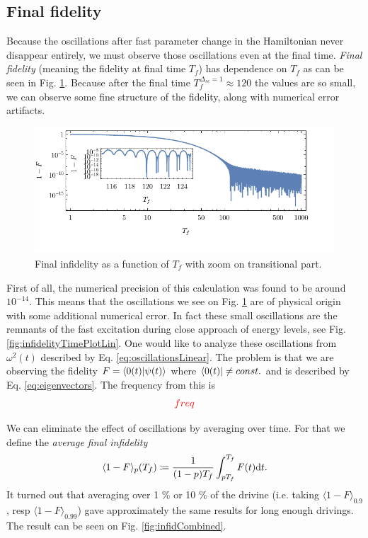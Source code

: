 \subsection{Final fidelity}
Because the oscillations after fast parameter change in the Hamiltonian never disappear entirely, we must observe those oscillations even at the final time. \emph{Final fidelity} (meaning the fidelity at final time $T_f$) has dependence on $T_f$ as can be seen in Fig. \ref{fig:infidelityTfPlotLogLinCombined}. Because after the final time $T_f^{\Delta_{sc}=1}\approx 120$ the values are so small, we can observe some fine structure of the fidelity, along with numerical error artifacts.
\begin{figure}[H]
    \centering
    \includegraphics[scale=1.2]{../img/infidelityTfPlotLogLinCombined1.pdf}
    \caption{Final infidelity as a function of $T_f$ with zoom on transitional part.}
    \label{fig:infidelityTfPlotLogLinCombined}
\end{figure}

First of all, the numerical precision of this calculation was found to be around $10^{-14}$. This means that the oscillations we see on Fig. \ref{fig:infidelityTfPlotLogLinCombined} are of physical origin with some additional numerical error. In fact these small oscillations are the remnants of the fast excitation during close approach of energy levels, see Fig. \ref{fig:infidelityTimePlotLin}. One would like to analyze these oscillations from $\omega^2(t)$ described by Eq. \ref{eq:oscillationsLinear}. The problem is that we are observing the fidelity $F=\braket{0(t)|\psi(t)}$ where $\bra{0(t)}\neq const.$ and is described by Eq. \ref{eq:eigenvectors}. The frequency from this is
\begin{equation}
    \textcolor{red}{freq}
\end{equation}


We can eliminate the effect of oscillations by averaging over time. For that we define the \emph{average final infidelity}
\begin{equation}
    \langle 1-F\rangle_p(T_f) \coloneqq \frac{1}{(1-p) T_f}\int_{p T_f}^{T_f} F(t)\mathrm{d} t.
\end{equation}
It turned out that averaging over 1 \% or 10 \% of the drivine (i.e. taking $\langle 1-F\rangle_{0.9}$, resp $\langle 1-F\rangle_{0.99}$) gave approximately the same results for long enough drivings. The result can be seen on Fig. \ref{fig:infidCombined}.

